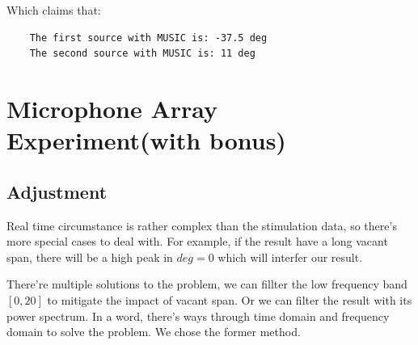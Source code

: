 \documentclass[UTF8]{article}
\begin{document}
Which claims that:
\begin{lstlisting}
    The first source with MUSIC is: -37.5 deg
    The second source with MUSIC is: 11 deg
\end{lstlisting}

\newpage
\section{Microphone Array Experiment(with bonus)}
\subsection{Adjustment}
\hspace{0.5em} Real time circumstance is rather complex than the stimulation data, so there's more special cases to deal with. For example, if the result have a long vacant span, there will be a high peak in $deg = 0$ which will interfer our result.


There're multiple solutions to the problem, we can fillter the low frequency band $[0, 20]$ to mitigate the impact of vacant span. Or we can filter the result with its power spectrum. In a word, there's ways through time domain and frequency domain to solve the problem. We chose the former method.
\end{document}
